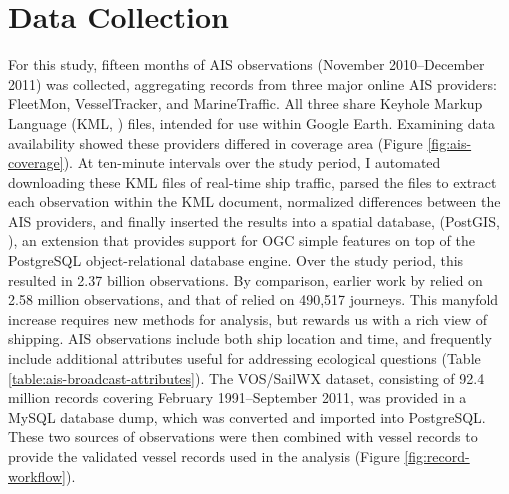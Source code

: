 \section{Data Collection}

For this study, fifteen months of AIS observations (November 2010--December 2011) was collected, aggregating records from three major online AIS providers: FleetMon, VesselTracker, and MarineTraffic. All three share Keyhole Markup Language (KML, \citeauthor{KML}) files, intended for use within Google Earth. Examining data availability showed these providers differed in coverage area (Figure \ref{fig:ais-coverage}).  At ten-minute intervals over the study period, I automated downloading these KML files of real-time ship traffic, parsed the files to extract each observation within the KML document, normalized differences between the AIS providers, and finally inserted the results into a spatial database, (\textsf{PostGIS}, \citeauthor{ramsey2005postgis}), an extension that provides support for OGC simple features \citep{OGCSimple} on top of the \textsf{PostgreSQL} \citep{postgresql} object-relational database engine. Over the study period, this resulted in 2.37 billion observations. By comparison, earlier work by \cite{Halpern2008} relied on 2.58 million observations, and that of \cite{Kaluza2010} relied on 490,517 journeys. This manyfold increase requires new methods for analysis, but rewards us with a rich view of shipping. %
AIS observations include both ship location and time, and frequently include additional attributes useful for addressing ecological questions (Table \ref{table:ais-broadcast-attributes}).  The VOS/SailWX dataset, consisting of 92.4 million records covering February 1991--September 2011, was provided in a \textsf{MySQL} database dump, which was converted and imported into \textsf{PostgreSQL}. These two sources of observations were then combined with vessel records to provide the validated vessel records used in the analysis (Figure \ref{fig:record-workflow}).


